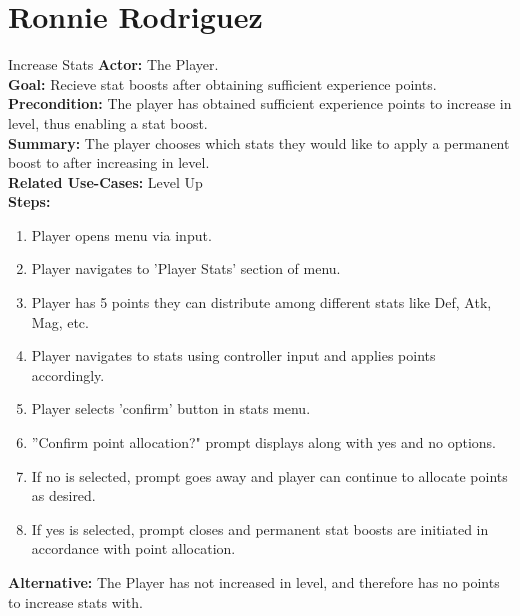 \documentclass[12pt]{report}
\begin{document}
\section{Ronnie Rodriguez}
\begin{subsection}{Increase Stats}
\textbf{Actor:} The Player. \\
\textbf{Goal:} Recieve stat boosts after obtaining sufficient experience points. \\
\textbf{Precondition:} The player has obtained sufficient experience points to increase in level, thus enabling a stat boost. \\
\textbf{Summary:} The player chooses which stats they would like to apply a permanent boost to after increasing in level.  \\
\textbf{Related Use-Cases:} Level Up \\
\textbf{Steps:}
\begin{enumerate}
	\item Player opens menu via input.
	\item Player navigates to 'Player Stats' section of menu.
	\item Player has 5 points they can distribute among different stats like Def, Atk, Mag, etc.
	\item Player navigates to stats using controller input and applies points accordingly.
	\item Player selects 'confirm' button in stats menu.
	\item ''Confirm point allocation?" prompt displays along with yes and no options.
	\item If no is selected, prompt goes away and player can continue to allocate points as desired.
	\item If yes is selected, prompt closes and permanent stat boosts are initiated in accordance with point allocation.
\end{enumerate}
\textbf{Alternative:} The Player has not increased in level, and therefore has no points to increase stats with.
\end{subsection}
\end{document}
